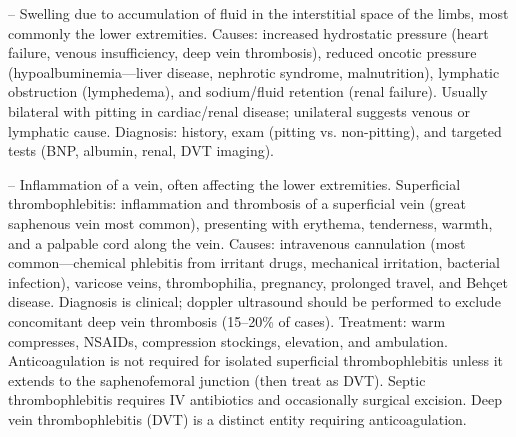 -- Swelling due to accumulation of fluid in the interstitial space of the limbs, most commonly the lower extremities. Causes: increased hydrostatic pressure (heart failure, venous insufficiency, deep vein thrombosis), reduced oncotic pressure (hypoalbuminemia—liver disease, nephrotic syndrome, malnutrition), lymphatic obstruction (lymphedema), and sodium/fluid retention (renal failure). Usually bilateral with pitting in cardiac/renal disease; unilateral suggests venous or lymphatic cause. Diagnosis: history, exam (pitting vs. non-pitting), and targeted tests (BNP, albumin, renal, DVT imaging).

-- Inflammation of a vein, often affecting the lower extremities. Superficial thrombophlebitis: inflammation and thrombosis of a superficial vein (great saphenous vein most common), presenting with erythema, tenderness, warmth, and a palpable cord along the vein. Causes: intravenous cannulation (most common—chemical phlebitis from irritant drugs, mechanical irritation, bacterial infection), varicose veins, thrombophilia, pregnancy, prolonged travel, and Behçet disease. Diagnosis is clinical; doppler ultrasound should be performed to exclude concomitant deep vein thrombosis (15--20\% of cases). Treatment: warm compresses, NSAIDs, compression stockings, elevation, and ambulation. Anticoagulation is not required for isolated superficial thrombophlebitis unless it extends to the saphenofemoral junction (then treat as DVT). Septic thrombophlebitis requires IV antibiotics and occasionally surgical excision. Deep vein thrombophlebitis (DVT) is a distinct entity requiring anticoagulation.

